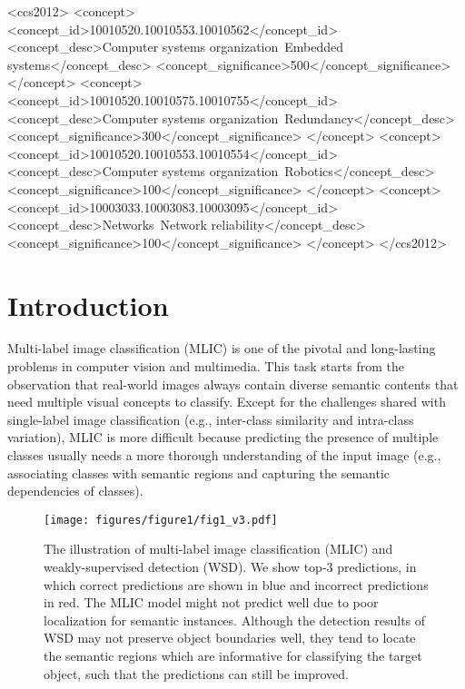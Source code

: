 \documentclass[sigconf,natbib=false]{acmart}
\begin{document}
\begin{CCSXML}
<ccs2012>
 <concept>
  <concept_id>10010520.10010553.10010562</concept_id>
  <concept_desc>Computer systems organization~Embedded systems</concept_desc>
  <concept_significance>500</concept_significance>
 </concept>
 <concept>
  <concept_id>10010520.10010575.10010755</concept_id>
  <concept_desc>Computer systems organization~Redundancy</concept_desc>
  <concept_significance>300</concept_significance>
 </concept>
 <concept>
  <concept_id>10010520.10010553.10010554</concept_id>
  <concept_desc>Computer systems organization~Robotics</concept_desc>
  <concept_significance>100</concept_significance>
 </concept>
 <concept>
  <concept_id>10003033.10003083.10003095</concept_id>
  <concept_desc>Networks~Network reliability</concept_desc>
  <concept_significance>100</concept_significance>
 </concept>
</ccs2012>
\end{CCSXML}





\maketitle

\section{Introduction}
Multi-label image classification (MLIC) \cite{MLIC27_ijdwm09_tgit,MLIC25_ijca17_RS} is one of the pivotal and long-lasting problems in computer vision and multimedia.
This task starts from the observation that real-world images always contain diverse semantic contents that need multiple visual concepts to classify.
Except for the challenges shared with single-label image classification (e.g., inter-class similarity and intra-class variation), MLIC is more difficult because predicting the presence of multiple classes usually needs a more thorough understanding of the input image (e.g., associating classes with semantic regions and capturing the semantic dependencies of classes).

\begin{figure}[t]
\centerline{\texttt{[image: figures/figure1/fig1\_v3.pdf]}}
\vspace{0pt}\caption{\small The illustration of multi-label image classification (MLIC) and weakly-supervised detection (WSD).
We show top-3 predictions, in which correct predictions are shown in \textcolor[rgb]{0.00,0.00,1.00}{blue} and incorrect predictions in \textcolor[rgb]{1.00,0.00,0.00}{red}.
The MLIC model might not predict well due to poor localization for semantic instances.
Although the detection results of WSD may not preserve object boundaries well, they tend to locate the semantic regions which are informative for classifying the target object, such that the predictions can still be improved.}
\label{Fig:introduction}
\vspace{-10pt}
\end{figure}
\end{document}
